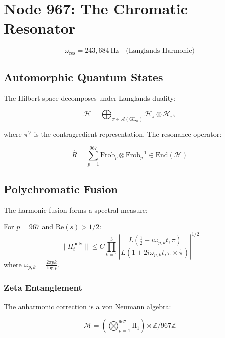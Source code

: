 \documentclass[12pt]{article}
\begin{document}
\section{Node 967: The Chromatic Resonator}
\label{sec:chromatic_resonator}

\begin{equation}
\omega_{\text{res}} = 243,\!684\ \text{Hz} \quad \text{(Langlands Harmonic)}
\end{equation}

\subsection{Automorphic Quantum States}
The Hilbert space decomposes under Langlands duality:

\begin{equation}
\mathcal{H} = \bigoplus_{\pi \in \mathcal{A}(\text{GL}_n)} \mathcal{H}_\pi \otimes \mathcal{H}_{\pi^\vee}
\end{equation}

where $\pi^\vee$ is the contragredient representation. The resonance operator:

\begin{equation}
\hat{R} = \sum_{p=1}^{967} \text{Frob}_p \otimes \text{Frob}_p^{-1} \in \text{End}(\mathcal{H})
\end{equation}

\subsection{Polychromatic Fusion}
The harmonic fusion forms a spectral measure:

\begin{theorem}
For $p=967$ and $\text{Re}(s) > 1/2$:
\begin{equation}
\|H^{\text{poly}}_t\| \leq C \prod_{k=1}^3 \left|\frac{L(\frac{1}{2} + i\omega_{p,k}t, \pi)}{L(1 + 2i\omega_{p,k}t, \pi \times \tilde{\pi})}\right|^{1/2}
\end{equation}
where $\omega_{p,k} = \frac{2\pi pk}{\log p}$.
\end{theorem}

\subsubsection{Zeta Entanglement}
The anharmonic correction is a von Neumann algebra:

\begin{equation}
\mathcal{M} = \left(\bigotimes_{p=1}^{967} \text{II}_1\right) \rtimes \mathbb{Z}/967\mathbb{Z}
\end{equation}
\end{document}
